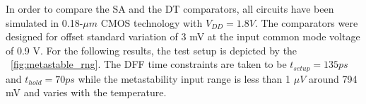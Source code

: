 
In order to compare the SA and the DT comparators, all circuits have been simulated in 0.18-$\mu m$ CMOS technology with $V_{DD} = 1.8 V$. The comparators were designed for offset standard variation of 3 mV at the input common mode voltage of 0.9 V. For the following results, the test setup is depicted by the \figurename~\ref{fig:metastable_rng}. The DFF time constraints are taken to be $t_{setup} = 135 ps$ and $t_{hold} = 70 ps$ while the metastability input range is less than 1 $\mu V$ around 794 mV and varies with the temperature.

%





